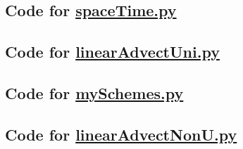 \subsection*{\clearpage{}Code for \protect\url{spaceTime.py}}

\clearpage{}


\subsection*{Code for \protect\url{linearAdvectUni.py}}




\subsection*{\clearpage{}Code for \protect\url{mySchemes.py}}




\subsection*{\clearpage{}Code for \protect\url{linearAdvectNonU.py}}

%

